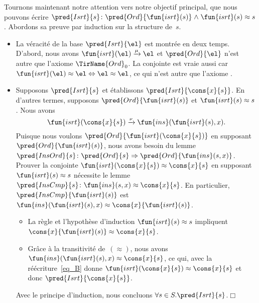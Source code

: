 Tournons maintenant notre attention vers notre objectif principal, que
nous pouvons écrire \(\pred{Isrt}{s}\colon \pred{Ord}{\fun{isrt}(s)}
\mathrel{\wedge} \fun{isrt}(s) \approx
s\). Abordons sa preuve par induction sur
la structure de~\(s\).
\begin{itemize}

  \item La véracité de la base \(\pred{Isrt}{\el}\) est montrée en deux
  temps. D'abord, nous avons \(\fun{isrt}(\el)
  \xrightarrow{\smash{\mu}} \el\) et \(\pred{Ord}{\el}\) n'est autre
  que l'axiome \(\TirName{Ord}_0\). La conjointe est vraie aussi car
  \(\fun{isrt}(\el) \approx \el \Leftrightarrow \el \approx \el\), ce
  qui n'est autre que l'axiome .

  \item Supposons \(\pred{Isrt}{s}\) et établissons
  \(\pred{Isrt}{\cons{x}{s}}\). En d'autres termes, supposons
  \(\pred{Ord}{\fun{isrt}(s)}\) et \(\fun{isrt}(s) \approx s\). Nous
  avons
  \begin{equation}
    \fun{isrt}(\cons{x}{s}) \xrightarrow{\smash{\nu}}
    \fun{ins}(\fun{isrt}(s),x).\label{eq_B}
  \end{equation}
  Puisque nous voulons \(\pred{Ord}{\fun{isrt}(\cons{x}{s})}\) en
  supposant \(\pred{Ord}{\fun{isrt}(s)}\), nous avons besoin du lemme
  \(\pred{InsOrd}{s} \colon \pred{Ord}{s} \Rightarrow
  \pred{Ord}{\fun{ins}(s,x)}\).
  Prouver la conjointe \(\fun{isrt}(\cons{x}{s}) \approx \cons{x}{s}\)
  en supposant \(\fun{isrt}(s) \approx s\) nécessite le lemme
  \(\pred{InsCmp}{s} \colon \fun{ins}(s,x) \approx \cons{x}{s}\). En
  particulier, \(\pred{InsCmp}{\fun{isrt}(s)}\) est
  \(\fun{ins}(\fun{isrt}(s),x) \approx \cons{x}{\fun{isrt}(s)}\).
  \begin{itemize}

  \item La règle  et l'hypothèse d'induction
    \(\fun{isrt}(s) \approx s\) impliquent \(\cons{x}{\fun{isrt}(s)}
    \approx \cons{x}{s}\).

  \item Grâce à la transitivité de~\((\approx)\), nous avons
    \(\fun{ins}(\fun{isrt}(s),x) \approx \cons{x}{s}\), ce qui, avec
    la réécriture~\eqref{eq_B} donne \(\fun{isrt}(\cons{x}{s}) \approx
    \cons{x}{s}\) et donc \(\pred{Isrt}{\cons{x}{s}}\).

  \end{itemize}
  Avec le principe d'induction, nous concluons \(\forall s \in
  S.\pred{Isrt}{s}\).\hfill\(\Box\)

\end{itemize}


